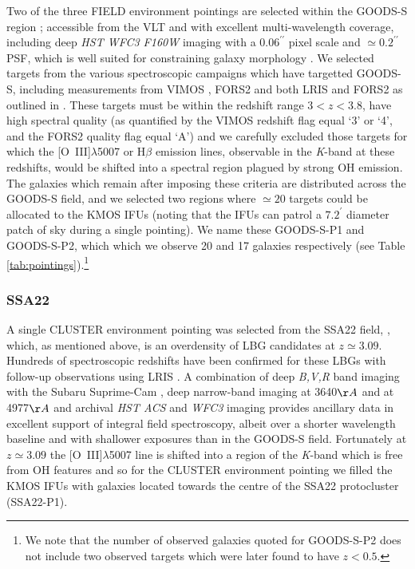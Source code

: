 \documentclass[fleqn,usenatbib]{mnras}
\begin{document}
Two of the three FIELD environment pointings are selected within the GOODS-S region \citep{Guo2013}; accessible from the VLT and with excellent multi-wavelength coverage, including deep {\em HST WFC3 F160W} imaging with a $0.06^{\prime\prime}$ pixel scale and $\simeq0.2^{\prime\prime}$ PSF, which is well suited for constraining galaxy morphology \citep{Grogin2011,Koekemoer2011}.
We selected targets from the various spectroscopic campaigns which have targetted GOODS-S, including measurements from VIMOS \citep{Balestra2010,Cassata2014}, FORS2 \citep{Vanzella2005,Vanzella2006,Vanzella2008} and both LRIS and FORS2 as outlined in \cite{Wuyts2009}.
These targets must be within the redshift range $3 < z < 3.8$, have high spectral quality (as quantified by the VIMOS redshift flag equal `3' or `4', and the FORS2 quality flag equal `A') and we carefully excluded those targets for which the [O~{\sc III}]$\lambda$5007 or H$\beta$ emission lines, observable in the {\it K}-band at these redshifts, would be shifted into a spectral region plagued by strong OH emission.
The galaxies which remain after imposing these criteria are distributed across the GOODS-S field, and we selected two regions where $\simeq20$ targets could be allocated to the KMOS IFUs (noting that the IFUs can patrol a $7.2^{\prime}$ diameter patch of sky during a single pointing).
We name these GOODS-S-P1 and GOODS-S-P2, which which we observe 20 and 17 galaxies respectively (see Table \ref{tab:pointings}).\footnote{We note that the number of observed galaxies quoted for GOODS-S-P2 does not include two observed targets which were later found to have $z < 0.5$.}

\subsubsection{SSA22}\label{subsubsec:sample_selection_ssa}
A single CLUSTER environment pointing was selected from the SSA22 field, \citep{Steidel1998,Steidel2000,Steidel2003,Shapley2003}, which, as mentioned above, is an overdensity of LBG candidates at $z\simeq3.09$.
Hundreds of spectroscopic redshifts have been confirmed for these LBGs with follow-up observations using LRIS \citep{Shapley2003,Nestor2013}.
A combination of deep {\em B,V,R} band imaging with the Subaru Suprime-Cam \citep{Matsuda2004}, deep narrow-band imaging at 3640$\AA$ \citep{Matsuda2004} and at 4977$\AA$ \citep{Nestor2011,Yamada2012a} and archival {\em HST ACS} and {\it WFC3} imaging provides ancillary data in excellent support of integral field spectroscopy, albeit over a shorter wavelength baseline and with shallower exposures than in the GOODS-S field.
Fortunately at $z\simeq3.09$ the [O~{\sc III}]$\lambda$5007 line is shifted into a region of the {\it K}-band which is free from OH features and so for the CLUSTER environment pointing we filled the KMOS IFUs with galaxies located towards the centre of the SSA22 protocluster (SSA22-P1).
\end{document}
